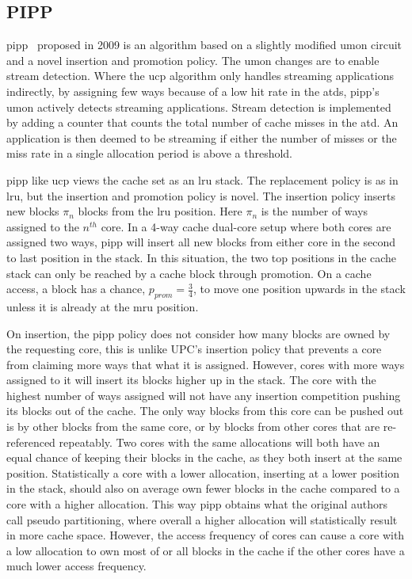 
\subsection{PIPP}
\label{sec:algorithms:pipp}

\gls{pipp}~\cite{Xie2009} proposed in 2009 is an algorithm based on a slightly modified \gls{umon} circuit and a novel insertion and promotion policy.
The \gls{umon} changes are to enable stream detection.
Where the \gls{ucp} algorithm only handles streaming applications indirectly, by assigning few ways because of a low hit rate in the \glspl{atd}, \gls{pipp}'s \gls{umon} actively detects streaming applications.
Stream detection is implemented by adding a counter that counts the total number of cache misses in the \gls{atd}.
An application is then deemed to be streaming if either the number of misses or the miss rate in a single allocation period is above a threshold.

\gls{pipp} like \gls{ucp} views the cache set as an \gls{lru} stack.
The replacement policy is as in \gls{lru}, but the insertion and promotion policy is novel.
The insertion policy inserts new blocks $\pi_n$ blocks from the \gls{lru} position. 
Here $\pi_n$ is the number of ways assigned to the $n^{th}$ core.
In a 4-way cache dual-core setup where both cores are assigned two ways, \gls{pipp} will insert all new blocks from either core in the second to last position in the stack. 
In this situation, the two top positions in the cache stack can only be reached by a cache block through promotion.
On a cache access, a block has a chance, $p_{prom} = \frac{3}{4}$, to move one position upwards in the stack unless it is already at the \gls{mru} position.

On insertion, the \gls{pipp} policy does not consider how many blocks are owned by the requesting core, this is unlike UPC's insertion policy that prevents a core from claiming more ways that what it is assigned.
However, cores with more ways assigned to it will insert its blocks higher up in the stack. 
The core with the highest number of ways assigned will not have any insertion competition pushing its blocks out of the cache.
The only way blocks from this core can be pushed out is by other blocks from the same core, or by blocks from other cores that are re-referenced repeatably.
Two cores with the same allocations will both have an equal chance of keeping their blocks in the cache, as they both insert at the same position.
Statistically a core with a lower allocation, inserting at a lower position in the stack, should also on average own fewer blocks in the cache compared to a core with a higher allocation.
This way \gls{pipp} obtains what the original authors call pseudo partitioning, where overall a higher allocation will statistically result in more cache space.
However, the access frequency of cores can cause a core with a low allocation to own most of or all blocks in the cache if the other cores have a much lower access frequency.

